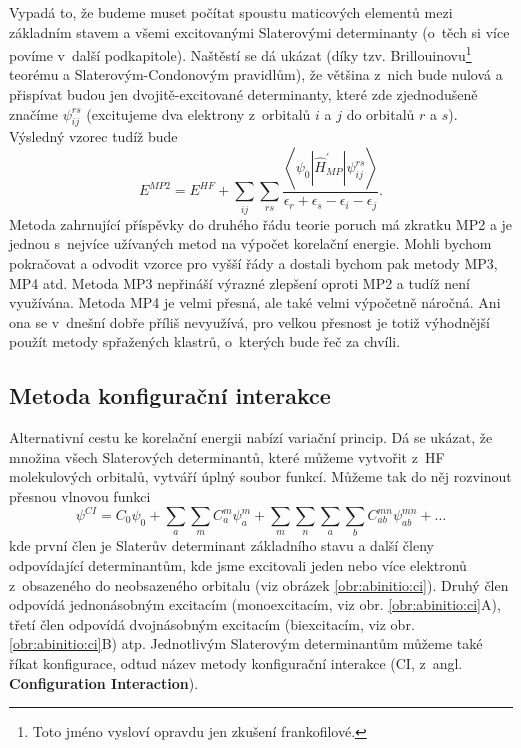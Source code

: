 Vypadá to, že budeme muset počítat spoustu maticových elementů mezi základním stavem a všemi excitovanými Slaterovými determinanty (o~těch si více povíme v~další podkapitole). Naštěstí se dá ukázat (díky tzv. Brillouinovu\footnote{Toto jméno vysloví opravdu jen zkušení frankofilové.} teorému a Slaterovým-Condonovým pravidlům), že většina z~nich bude nulová a přispívat budou jen dvojitě-excitované determinanty, které zde zjednodušeně značíme $\psi_{ij}^{rs}$ (excitujeme dva elektrony z~orbitalů $i$ a $j$ do orbitalů $r$ a $s$). Výsledný vzorec tudíž bude
\begin{equation}
E^{MP2}= E^{HF} + \sum_{ij} \sum_{rs} \frac{\left < \psi_0 | \hat{H}^{\prime}_{MP} | \psi_{ij}^{rs} \right > }{\epsilon_r+\epsilon_s-\epsilon_i-\epsilon_j} .
\end{equation}
Metoda zahrnující příspěvky do druhého řádu teorie poruch má zkratku MP2 a je jednou s~nejvíce užívaných metod na výpočet korelační energie. Mohli bychom pokračovat a odvodit vzorce pro vyšší řády a dostali bychom pak metody MP3, MP4 atd. 
Metoda MP3 nepřináší výrazné zlepšení oproti MP2 a tudíž není využívána. Metoda MP4 je velmi přesná, ale také velmi výpočetně náročná. Ani ona se v~dnešní dobře příliš nevyužívá, pro velkou přesnost je totiž výhodnější použít metody spřažených klastrů, o~kterých bude řeč za chvíli.


\subsection{Metoda konfigurační interakce}

Alternativní cestu ke korelační energii nabízí variační princip. Dá se ukázat, že množina všech Slaterových determinantů, které můžeme vytvořit z~HF molekulových orbitalů, vytváří úplný soubor funkcí. Můžeme tak do něj rozvinout přesnou vlnovou funkci 
\begin{equation}
\psi^{CI}=C_0\psi_0+\sum_a\sum_m C_a^m\psi_a^m+\sum_m \sum_n \sum_a \sum_b C_{ab}^{mn}\psi_{ab}^{mn}+\dots
\label{rov:CIrozvoj}
\end{equation}
kde první člen je Slaterův determinant základního stavu a další členy odpovídající determinantům, kde jsme excitovali jeden nebo více elektronů z~obsazeného do neobsazeného orbitalu (viz obrázek \ref{obr:abinitio:ci}). Druhý člen odpovídá jednonásobným excitacím (monoexcitacím, viz obr. \ref{obr:abinitio:ci}A), třetí člen odpovídá dvojnásobným excitacím (biexcitacím,
viz obr.\,\ref{obr:abinitio:ci}B) atp. Jednotlivým Slaterovým determinantům můžeme také říkat konfigurace, odtud název metody konfigurační interakce (CI, z~angl. \textbf{Configuration Interaction}).


